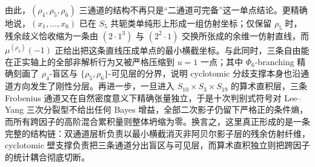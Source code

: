 由此，\((\rho_4,\rho_5,\rho_6)\) 三通道的结构不再只是“二通道可完备”这一单点结论。更精确地说，\((x_1,\dots,x_6)\) 已在 \(S_5\) 共轭类单纯形上形成一组仿射坐标；仅保留 \(\rho_5\) 时，残余歧义恰收缩为一条由 \((2\cdot1^3)\) 与 \((2^2\cdot1)\) 交换所张成的余维一仿射直线，而 \(\mu^{(\rho_4)}(-1)\) 正给出把这条直线压成单点的最小横截坐标。与此同时，三条自由能在正实轴上的全部非解析行为又被严格压缩到 \(u=1\) 一点；其中 \(\Phi_6\)-branching 精确刻画了 \(\rho_4\)-盲区与 \(\{\rho_5,\rho_6\}\)-可见层的分界，说明 cyclotomic 分歧支撑本身也沿通道方向发生了刚性分层。再进一步，一旦进入 \(S_{10}\times S_3\times S_{19}\) 的算术直积层，三条 Frobenius 通道又在自然密度意义下精确张量独立，于是十次判别式符号对 Lee--Yang 三次分裂型不给出任何 Bayes 增益，全部二次影子仍留下严格正的条件熵，而所有跨因子的高阶混合累积量则整体坍缩为零。换言之，这里真正形成的是一条完整的结构链：双通道层析负责以最小横截消灭非阿贝尔影子层的残余仿射纤维，cyclotomic 壁支撑负责把三条通道分出盲区与可见层，而算术直积独立则把跨因子的统计耦合彻底切断。

\endinput
